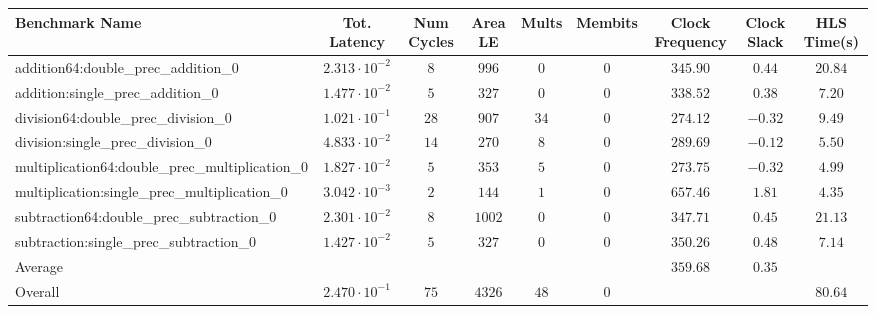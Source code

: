 \begin{tabular}{|l|c|c|c|c|c|c|c|c|}
\hline
Benchmark Name                                   & Tot. Latency            & Num Cycles & Area LE  & Mults  & Membits & Clock Frequency & Clock Slack & HLS Time(s) \\
\hline
addition64:double\_prec\_addition\_0             & $ 2.313 \cdot 10^{-2} $ & $ 8      $ & $ 996  $ & $ 0  $ & $ 0   $ & $ 345.90      $ & $ 0.44    $ & $ 20.84   $ \\
addition:single\_prec\_addition\_0               & $ 1.477 \cdot 10^{-2} $ & $ 5      $ & $ 327  $ & $ 0  $ & $ 0   $ & $ 338.52      $ & $ 0.38    $ & $ 7.20    $ \\
division64:double\_prec\_division\_0             & $ 1.021 \cdot 10^{-1} $ & $ 28     $ & $ 907  $ & $ 34 $ & $ 0   $ & $ 274.12      $ & $ -0.32   $ & $ 9.49    $ \\
division:single\_prec\_division\_0               & $ 4.833 \cdot 10^{-2} $ & $ 14     $ & $ 270  $ & $ 8  $ & $ 0   $ & $ 289.69      $ & $ -0.12   $ & $ 5.50    $ \\
multiplication64:double\_prec\_multiplication\_0 & $ 1.827 \cdot 10^{-2} $ & $ 5      $ & $ 353  $ & $ 5  $ & $ 0   $ & $ 273.75      $ & $ -0.32   $ & $ 4.99    $ \\
multiplication:single\_prec\_multiplication\_0   & $ 3.042 \cdot 10^{-3} $ & $ 2      $ & $ 144  $ & $ 1  $ & $ 0   $ & $ 657.46      $ & $ 1.81    $ & $ 4.35    $ \\
subtraction64:double\_prec\_subtraction\_0       & $ 2.301 \cdot 10^{-2} $ & $ 8      $ & $ 1002 $ & $ 0  $ & $ 0   $ & $ 347.71      $ & $ 0.45    $ & $ 21.13   $ \\
subtraction:single\_prec\_subtraction\_0         & $ 1.427 \cdot 10^{-2} $ & $ 5      $ & $ 327  $ & $ 0  $ & $ 0   $ & $ 350.26      $ & $ 0.48    $ & $ 7.14    $ \\
\hline
Average                                          & $                     $ & $        $ & $      $ & $    $ & $     $ & $ 359.68      $ & $ 0.35    $ & $         $ \\
\hline
Overall                                          & $ 2.470 \cdot 10^{-1} $ & $ 75     $ & $ 4326 $ & $ 48 $ & $ 0   $ & $             $ & $         $ & $ 80.64   $ \\
\hline
\end{tabular}

